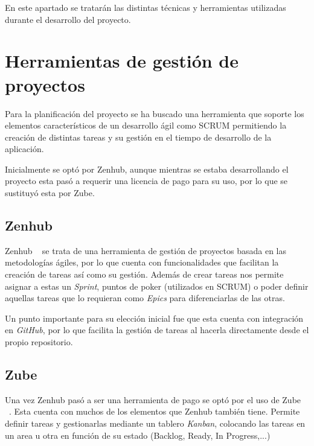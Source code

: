 
En este apartado se tratarán las distintas técnicas y herramientas utilizadas durante el desarrollo
del proyecto.

\section{Herramientas de gestión de proyectos}
Para la planificación del proyecto se ha buscado una herramienta que soporte
los elementos característicos de un desarrollo ágil como SCRUM permitiendo la creación
de distintas tareas y su gestión en el tiempo de desarrollo de la aplicación. 

Inicialmente se optó por Zenhub, aunque mientras se estaba desarrollando el proyecto
esta pasó a requerir una licencia de pago para su uso, por lo que se sustituyó esta
por Zube.

\subsection{Zenhub}
Zenhub ~\cite{zenhubZenhubProductivity} se trata de una herramienta de gestión de proyectos basada en las metodologías
ágiles, por lo que cuenta con funcionalidades que facilitan la creación de tareas así como su gestión.
Además de crear tareas nos permite asignar a estas un \textit{Sprint}, puntos de poker (utilizados en SCRUM)
o poder definir aquellas tareas que lo requieran como \textit{Epics} para diferenciarlas de las otras.


Un punto importante para su elección inicial fue que esta cuenta con integración en \textit{GitHub},
por lo que facilita la gestión de tareas al hacerla directamente desde el propio repositorio.
\subsection{Zube}
Una vez Zenhub pasó a ser una herramienta de pago se optó por el uso de Zube ~\cite{zubeZubeAgile}. Esta cuenta con muchos
de los elementos que Zenhub también tiene. Permite definir tareas y gestionarlas mediante un tablero \textit{Kanban},
colocando las tareas en un area u otra en función de su estado (Backlog, Ready, In Progress,...)

